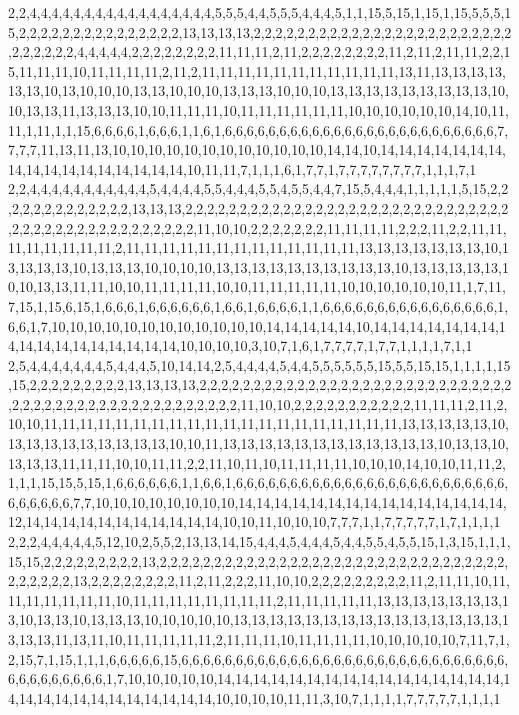 2,2,4,4,4,4,4,4,4,4,4,4,4,4,4,4,4,4,4,5,5,5,4,4,5,5,5,4,4,4,5,1,1,15,5,15,1,15,1,15,5,5,5,15,2,2,2,2,2,2,2,2,2,2,2,2,2,2,2,13,13,13,13,2,2,2,2,2,2,2,2,2,2,2,2,2,2,2,2,2,2,2,2,2,2,2,2,2,2,2,2,2,2,4,4,4,4,4,2,2,2,2,2,2,2,2,11,11,11,2,11,2,2,2,2,2,2,2,2,11,2,11,2,11,11,2,2,15,11,11,11,10,11,11,11,11,2,11,2,11,11,11,11,11,11,11,11,11,11,11,13,11,13,13,13,13,13,13,10,13,10,10,10,13,13,10,10,10,13,13,13,10,10,10,13,13,13,13,13,13,13,13,13,10,10,13,13,11,13,13,13,10,10,11,11,11,10,11,11,11,11,11,11,10,10,10,10,10,10,14,10,11,11,1,11,1,1,15,6,6,6,6,1,6,6,6,1,1,6,1,6,6,6,6,6,6,6,6,6,6,6,6,6,6,6,6,6,6,6,6,6,6,6,6,6,7,7,7,7,11,13,11,13,10,10,10,10,10,10,10,10,10,10,10,10,14,14,10,14,14,14,14,14,14,14,14,14,14,14,14,14,14,14,14,14,10,11,11,7,1,1,1,6,1,7,7,1,7,7,7,7,7,7,7,7,1,1,1,7,1
2,2,4,4,4,4,4,4,4,4,4,4,4,5,4,4,4,4,5,5,4,4,4,5,5,4,5,5,4,4,7,15,5,4,4,4,1,1,1,1,1,5,15,2,2,2,2,2,2,2,2,2,2,2,2,2,13,13,13,2,2,2,2,2,2,2,2,2,2,2,2,2,2,2,2,2,2,2,2,2,2,2,2,2,2,2,2,2,2,2,2,2,2,2,2,2,2,2,2,2,2,2,2,2,2,2,11,10,10,2,2,2,2,2,2,2,11,11,11,11,2,2,2,11,2,2,11,11,11,11,11,11,11,11,2,11,11,11,11,11,11,11,11,11,11,11,11,11,13,13,13,13,13,13,13,10,13,13,13,13,10,13,13,13,10,10,10,10,13,13,13,13,13,13,13,13,13,13,10,13,13,13,13,13,10,10,13,13,11,11,10,10,11,11,11,11,10,10,11,11,11,11,11,10,10,10,10,10,10,11,1,7,11,7,15,1,15,6,15,1,6,6,6,1,6,6,6,6,6,6,1,6,6,1,6,6,6,6,1,1,6,6,6,6,6,6,6,6,6,6,6,6,6,6,6,6,1,6,6,1,7,10,10,10,10,10,10,10,10,10,10,10,10,14,14,14,14,14,10,14,14,14,14,14,14,14,14,14,14,14,14,14,14,14,14,14,10,10,10,10,3,10,7,1,6,1,7,7,7,7,1,7,7,1,1,1,1,7,1,1
2,5,4,4,4,4,4,4,4,5,4,4,4,5,10,14,14,2,5,4,4,4,4,5,4,4,5,5,5,5,5,5,15,5,5,15,15,1,1,1,1,15,15,2,2,2,2,2,2,2,2,2,13,13,13,13,2,2,2,2,2,2,2,2,2,2,2,2,2,2,2,2,2,2,2,2,2,2,2,2,2,2,2,2,2,2,2,2,2,2,2,2,2,2,2,2,2,2,2,2,2,2,2,2,2,2,11,10,10,2,2,2,2,2,2,2,2,2,2,2,11,11,11,2,11,2,10,10,11,11,11,11,11,11,11,11,11,11,11,11,11,11,11,11,11,11,11,11,13,13,13,13,13,10,13,13,13,13,13,13,13,13,13,10,10,11,13,13,13,13,13,13,13,13,13,13,13,13,10,13,13,10,13,13,13,11,11,11,10,10,11,11,2,2,11,10,11,10,11,11,11,11,10,10,10,14,10,10,11,11,2,1,1,1,15,15,5,15,1,6,6,6,6,6,6,1,1,6,6,1,6,6,6,6,6,6,6,6,6,6,6,6,6,6,6,6,6,6,6,6,6,6,6,6,6,6,6,6,6,6,6,7,7,10,10,10,10,10,10,10,10,14,14,14,14,14,14,14,14,14,14,14,14,14,14,14,12,14,14,14,14,14,14,14,14,14,14,14,10,10,11,10,10,10,7,7,7,1,1,7,7,7,7,7,1,7,1,1,1,1
2,2,2,4,4,4,4,4,5,12,10,2,5,5,2,13,13,14,15,4,4,4,5,4,4,4,5,4,4,5,5,4,5,5,15,1,3,15,1,1,1,15,15,2,2,2,2,2,2,2,2,2,13,2,2,2,2,2,2,2,2,2,2,2,2,2,2,2,2,2,2,2,2,2,2,2,2,2,2,2,2,2,2,2,2,2,2,2,2,2,2,13,2,2,2,2,2,2,2,2,11,2,11,2,2,2,11,10,10,2,2,2,2,2,2,2,2,2,11,2,11,11,10,11,11,11,11,11,11,11,10,11,11,11,11,11,11,11,11,2,11,11,11,11,11,13,13,13,13,13,13,13,13,10,13,13,10,13,13,13,10,10,10,10,10,13,13,13,13,13,13,13,13,13,13,13,13,13,13,13,13,13,13,11,13,11,10,11,11,11,11,11,2,11,11,11,10,11,11,11,11,10,10,10,10,10,7,11,7,1,2,15,7,1,15,1,1,1,6,6,6,6,6,15,6,6,6,6,6,6,6,6,6,6,6,6,6,6,6,6,6,6,6,6,6,6,6,6,6,6,6,6,6,6,6,6,6,6,6,6,6,6,6,1,7,10,10,10,10,10,14,14,14,14,14,14,14,14,14,14,14,14,14,14,14,14,14,14,14,14,14,14,14,14,14,14,14,14,10,10,10,10,11,11,3,10,7,1,1,1,1,7,7,7,7,7,1,1,1,1
